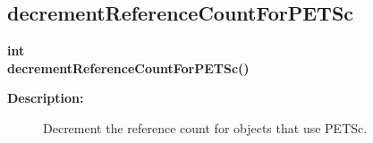 \subsection{decrementReferenceCountForPETSc}
 
\begin{flushleft} \textbf{%
int  \\ 
\settowidth{\OvertureIncludeArgIndent}{decrementReferenceCountForPETSc(}%
decrementReferenceCountForPETSc()
}\end{flushleft}
\begin{description}
\item[{\bf Description:}] 
   Decrement the reference count for objects that use PETSc.
\end{description}
